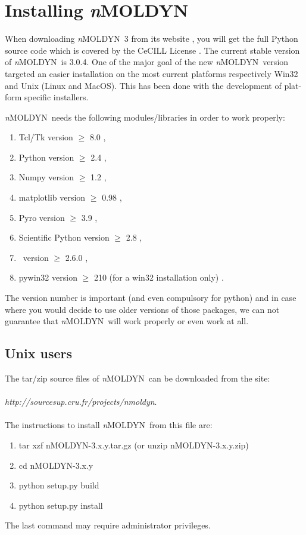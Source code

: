 \documentclass[a4paper,11pt]{report}
\newcommand{\NMOLDYN}{\textit{n}MOLDYN}
\begin{document}
\chapter{Installing \NMOLDYN}
\label{installing_nmoldyn}
When downloading \NMOLDYN\ 3 from its website \cite{nMOLDYN1,nMOLDYN2}, you will get the full Python source code 
which is covered by the CeCILL License \cite{CeCILL}. The current stable version of \NMOLDYN\ is 3.0.4. One of the major 
goal of the new \NMOLDYN\ version targeted  an easier installation on the most current platforms respectively Win32 and Unix 
(Linux and MacOS). This has been done with the development of plat-form specific installers.

\NMOLDYN\ needs the following modules/libraries in order to work properly:
\begin{enumerate}
\item{Tcl/Tk version $\geq$ 8.0 \cite{TclTk}},
\item{Python version $\geq$ 2.4 \cite{python}},
\item{Numpy version $\geq$ 1.2 \cite{NumPy}},
\item{matplotlib version $\geq$ 0.98 \cite{matplotlib}},
\item{Pyro version $\geq$ 3.9 \cite{Pyro}},
\item{Scientific Python version $\geq$ 2.8 \cite{Scientific1,Scientific2}},
\item{\MMTK\ version $\geq$ 2.6.0  \cite{Hinsen:2000,MMTK}},
\item{pywin32 version $\geq$ 210 (for a win32 installation only) \cite{pywin32}}.
\end{enumerate}

The version number is important (and even compulsory for python) and in case where you would decide to use older 
versions of those packages, we can not guarantee that \NMOLDYN\ will work properly or even work at all.

\section{Unix users}
\label{unix_users}
The tar/zip source files of \NMOLDYN\ can be downloaded from the site:
\\\\ 
{\itshape http://sourcesup.cru.fr/projects/nmoldyn}.
\\\\
The instructions to install \NMOLDYN\ from this file are:
\begin{enumerate}
\item {\ttfamily tar xzf nMOLDYN-3.x.y.tar.gz (or unzip nMOLDYN-3.x.y.zip)}\\
\item {\ttfamily cd nMOLDYN-3.x.y}\\
\item {\ttfamily python setup.py build}\\
\item {\ttfamily python setup.py install}\\
\end{enumerate}
The last command may require administrator privileges.
\end{document}
